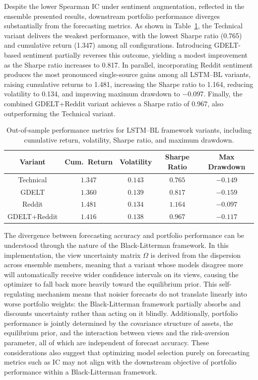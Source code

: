 Despite the lower Spearman IC under sentiment augmentation, reflected in the ensemble presented results, downstream portfolio performance diverges substantially from the forecasting metrics. As shown in Table~\ref{tab:lstmvreturns_metrics_portfolio}, the Technical variant delivers the weakest performance, with the lowest Sharpe ratio (0.765) and cumulative return (1.347) among all configurations. Introducing GDELT-based sentiment partially reverses this outcome, yielding a modest improvement as the Sharpe ratio increases to 0.817. In parallel, incorporating Reddit sentiment produces the most pronounced single-source gains among all LSTM--BL variants, raising cumulative returns to 1.481, increasing the Sharpe ratio to 1.164, reducing volatility to 0.134, and improving maximum drawdown to $-$0.097. Finally, the combined GDELT+Reddit variant achieves a Sharpe ratio of 0.967, also outperforming the Technical variant.

\begin{table}[ht]
\centering
\caption{Out-of-sample performance metrics for LSTM--BL framework variants, including cumulative return, volatility, Sharpe ratio, and maximum drawdown.}
\label{tab:lstmvreturns_metrics_portfolio}
\renewcommand{\arraystretch}{1.2}
\begin{tabular}{|c|c|c|c|c|}
\hline
\textbf{Variant} & \textbf{Cum.\ Return} & \textbf{Volatility} & \textbf{Sharpe Ratio} & \textbf{Max Drawdown} \\
\hline
Technical & $1.347$ & $0.143$ & $0.765$ & $-0.149$ \\
\hline
GDELT & $1.360$ & $0.139$ & $0.817$ & $-0.159$ \\
\hline
Reddit & $1.481$ & $0.134$ & $1.164$ & $-0.097$ \\
\hline
GDELT+Reddit & $1.416$ & $0.138$ & $0.967$ & $-0.117$ \\
\hline
\end{tabular}
\end{table}

The divergence between forecasting accuracy and portfolio performance can be understood through the nature of the Black-Litterman framework. In this implementation, the view uncertainty matrix $\Omega$ is derived from the dispersion across ensemble members, meaning that a variant whose models disagree more will automatically receive wider confidence intervals on its views, causing the optimizer to fall back more heavily toward the equilibrium prior. This self-regulating mechanism means that noisier forecasts do not translate linearly into worse portfolio weights: the Black-Litterman framework partially absorbs and discounts uncertainty rather than acting on it blindly. Additionally, portfolio performance is jointly determined by the covariance structure of assets, the equilibrium prior, and the interaction between views and the risk-aversion parameter, all of which are independent of forecast accuracy. These considerations also suggest that optimizing model selection purely on forecasting metrics such as IC may not align with the downstream objective of portfolio performance within a Black-Litterman framework.

